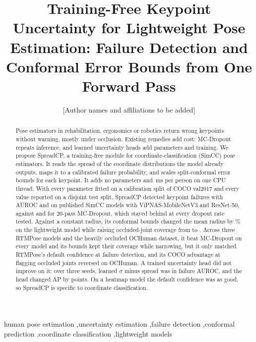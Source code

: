 \documentclass[preprint,11pt]{elsarticle}
\newcommand{\method}{SpreadCP}
\begin{document}
\begin{frontmatter}

\title{Training-Free Keypoint Uncertainty for Lightweight Pose Estimation: Failure Detection
and Conformal Error Bounds from One Forward Pass}

\author{[Author names and affiliations to be added]}

\begin{abstract}
Pose estimators in rehabilitation, ergonomics or robotics return wrong keypoints without warning,
mostly under occlusion. Existing remedies add cost: MC-Dropout repeats inference, and
learned uncertainty heads add parameters and training. We propose \method{}, a training-free module for
coordinate-classification (SimCC) pose estimators. It reads the spread of the coordinate distributions
the model already outputs, maps it to a calibrated failure probability, and scales split-conformal
error bounds for each keypoint. It adds no parameters and
\MethodCpuMs{}\,ms per person on one CPU thread. With every parameter fitted on a calibration split of
COCO val2017 and every value reported on a disjoint test split, \method{} detected keypoint failures
with AUROC \FaZsSimccMbvThreeDist{} and \FaZsSimccRFiveZeroDist{} on published SimCC models with
ViPNAS-MobileNetV3 and ResNet-50, against \FaZsSimccMbvThreeMcSoft{} and \FaZsSimccRFiveZeroMcSoft{} for
20-pass MC-Dropout, which stayed behind at every dropout rate tested. Against a constant radius, its
conformal bounds changed the mean radius by \RadiusChangeZsSimccMbvThree\% on the lightweight model while
raising
occluded-joint coverage from \CovOccZsSimccMbvThreeConstant{} to \CovOccZsSimccMbvThreeDist{}. Across three
RTMPose models and the heavily occluded OCHuman dataset, it beat MC-Dropout on every model and its
bounds kept their coverage while narrowing, but it only matched RTMPose's default confidence at failure
detection, and its COCO advantage at flagging occluded joints reversed on OCHuman. A trained
uncertainty head did not improve on it: over three seeds, learned $\sigma$ minus spread was
\SeedDfaHetMinusDist{} in failure AUROC, and the head changed AP by \SeedDapGt{} points. On a heatmap model the
default confidence was as good, so \method{} is specific to coordinate classification.
\end{abstract}

\begin{keyword}
human pose estimation \sep uncertainty estimation \sep failure detection \sep conformal prediction
\sep coordinate classification \sep lightweight models
\end{keyword}
\end{frontmatter}
\end{document}
